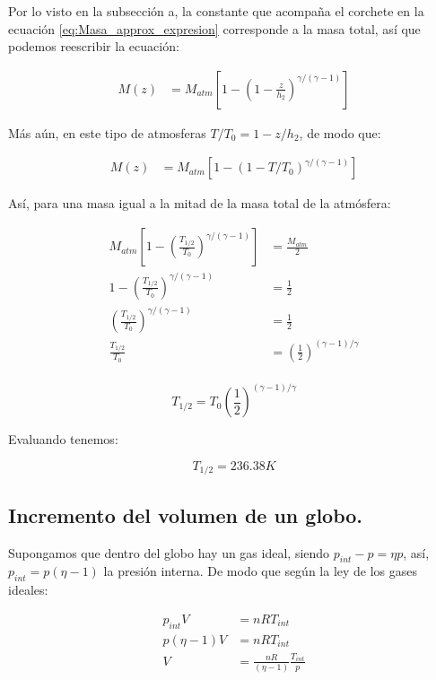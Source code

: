 Por lo visto en la subsección a, la constante que acompaña el corchete en la ecuación \ref{eq:Masa_approx_expresion} corresponde a la masa total, así que podemos reescribir la ecuación:

\begin{align*}
    M(z) &= M_{atm} \left[ 1 -  (1-\frac{z}{h_2})^{\gamma/(\gamma - 1)} \right]
\end{align*}

Más aún, en este tipo de atmosferas $ T/T_0 = 1 - z/h_2$, de modo que:

\begin{align*}
    M(z) &= M_{atm} \left[ 1 -  (1-T/T_0)^{\gamma/(\gamma - 1)} \right]
\end{align*}

Así, para una masa igual a la mitad de la masa total de la atmósfera:

\begin{align*}
    M_{atm} \left[ 1 -  \left(\frac{T_{1/2}}{T_0}\right)^{\gamma/(\gamma - 1)} \right] &= \frac{M_{atm}}{2} \\
    1 -  \left(\frac{T_{1/2}}{T_0}\right)^{\gamma/(\gamma - 1)} &= \frac{1}{2} \\
    \left(\frac{T_{1/2}}{T_0}\right)^{\gamma/(\gamma - 1)} &= \frac{1}{2} \\
    \frac{T_{1/2}}{T_0} &= \left( \frac{1}{2} \right)^{(\gamma - 1)/\gamma} \\
\end{align*}

\begin{equation}
    \boxed{T_{1/2} = T_0 \left( \frac{1}{2} \right)^{(\gamma - 1)/\gamma} }
\end{equation}

Evaluando tenemos:

\begin{equation}
    \boxed{T_{1/2} = 236.38 K}
\end{equation}


\subsection{Incremento del volumen de un globo.}

Supongamos que dentro del globo hay un gas ideal, siendo $p_{int} - p= \eta p$, así, $p_{int}= p(\eta - 1)$ la presión interna. De modo que según la ley de los gases ideales:

\begin{align*}
    p_{int} V &= n R T_{int} \\
    p(\eta-1) V &= n R T_{int} \\
    V &= \frac{nR}{(\eta-1)} \frac{T_{int}}{p}
\end{align*}

